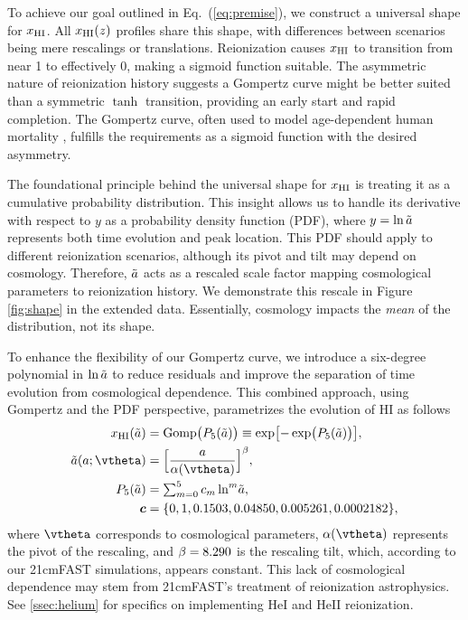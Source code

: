 To achieve our goal outlined in Eq.~(\ref{eq:premise}), we construct a
universal shape for $x_{\mathrm{HI}}$.
All $x_{\mathrm{HI}}(z)$ profiles share this shape, with differences between
scenarios being mere rescalings or translations.
Reionization causes $x_{\mathrm{HI}}$ to transition from near 1 to effectively 0,
making a sigmoid function suitable.
The asymmetric nature of reionization history
\cite{Trac2018, Doussot2019} suggests a Gompertz curve might be better
suited than a symmetric $\tanh$ transition, providing an early start and
rapid completion.
The Gompertz curve, often used to model age-dependent human mortality
\cite{Gompertz1825}, fulfills the requirements as a sigmoid function
with the desired asymmetry.

The foundational principle behind the universal shape for $x_{\mathrm{HI}}$ is
treating it as a cumulative probability distribution.
This insight allows us to handle its derivative with respect to $y$ as a
probability density function (PDF), where $y = \ln\tilde{a}$ represents both
time evolution and peak location.
This PDF should apply to different reionization scenarios, although its
pivot and tilt may depend on cosmology.
Therefore, $\tilde{a}$ acts as a rescaled scale factor mapping cosmological
parameters to reionization history.
We demonstrate this rescale in Figure \ref{fig:shape} in the extended
data.
Essentially, cosmology impacts the \emph{mean} of the distribution, not
its shape.

To enhance the flexibility of our Gompertz curve, we introduce a
six-degree polynomial in $\ln\tilde{a}$ to reduce residuals and improve the
separation of time evolution from cosmological dependence.
This combined approach, using Gompertz and the PDF perspective,
parametrizes the evolution of HI as follows
%
\begin{align}
\label{eq:uni}
x_\HI(\ar) &= \Gomp\bigl( P_5(\ar) \bigr)
  \equiv \exp\bigl[ - \exp\bigl( P_5(\ar) \bigr) \bigr], \\
%
\label{eq:map}
\ar(a; \vtheta) &= \Bigl[ \frac{a}{\ap(\vtheta)} \Bigr]^\tilt ,\\
%
\label{eq:poly}
P_5(\ar) &= {\textstyle\sum}_{m=0}^5 \, c_m \ln^m\!\ar, \\
%
\nonumber
\bm{c} &= \{0, 1, 0.1503, 0.04850, 0.005261, 0.0002182\},
\end{align}
%
where $\vtheta$ corresponds to cosmological parameters, $\ap(\vtheta)$
represents the pivot of the rescaling, and $\beta = 8.290$ is the
rescaling tilt, which, according to our 21cmFAST simulations, appears
constant.
This lack of cosmological dependence may stem from 21cmFAST's treatment
of reionization astrophysics.
See \ref{ssec:helium} for specifics on implementing HeI and HeII
reionization.

